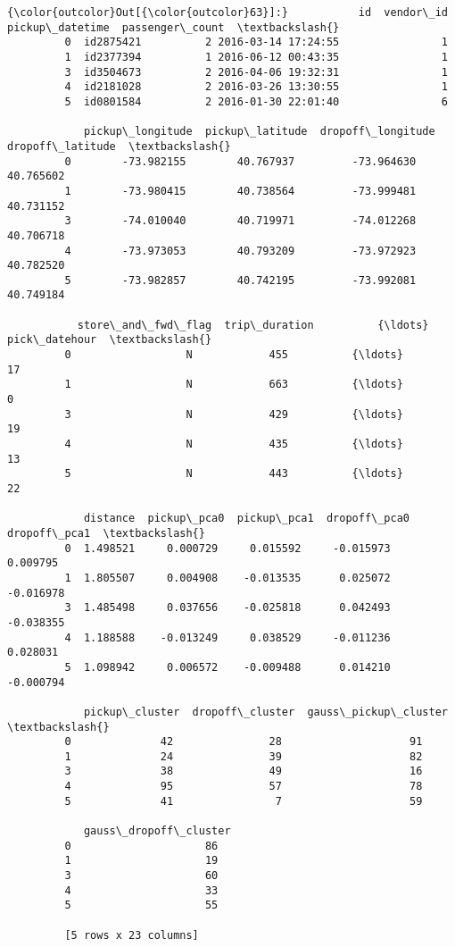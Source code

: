 \documentclass[11pt]{article}
\begin{document}
\begin{Verbatim}[commandchars=\\\{\}]
{\color{outcolor}Out[{\color{outcolor}63}]:}           id  vendor\_id     pickup\_datetime  passenger\_count  \textbackslash{}
         0  id2875421          2 2016-03-14 17:24:55                1   
         1  id2377394          1 2016-06-12 00:43:35                1   
         3  id3504673          2 2016-04-06 19:32:31                1   
         4  id2181028          2 2016-03-26 13:30:55                1   
         5  id0801584          2 2016-01-30 22:01:40                6   
         
            pickup\_longitude  pickup\_latitude  dropoff\_longitude  dropoff\_latitude  \textbackslash{}
         0        -73.982155        40.767937         -73.964630         40.765602   
         1        -73.980415        40.738564         -73.999481         40.731152   
         3        -74.010040        40.719971         -74.012268         40.706718   
         4        -73.973053        40.793209         -73.972923         40.782520   
         5        -73.982857        40.742195         -73.992081         40.749184   
         
           store\_and\_fwd\_flag  trip\_duration          {\ldots}            pick\_datehour  \textbackslash{}
         0                  N            455          {\ldots}                       17   
         1                  N            663          {\ldots}                        0   
         3                  N            429          {\ldots}                       19   
         4                  N            435          {\ldots}                       13   
         5                  N            443          {\ldots}                       22   
         
            distance  pickup\_pca0  pickup\_pca1  dropoff\_pca0  dropoff\_pca1  \textbackslash{}
         0  1.498521     0.000729     0.015592     -0.015973      0.009795   
         1  1.805507     0.004908    -0.013535      0.025072     -0.016978   
         3  1.485498     0.037656    -0.025818      0.042493     -0.038355   
         4  1.188588    -0.013249     0.038529     -0.011236      0.028031   
         5  1.098942     0.006572    -0.009488      0.014210     -0.000794   
         
            pickup\_cluster  dropoff\_cluster  gauss\_pickup\_cluster  \textbackslash{}
         0              42               28                    91   
         1              24               39                    82   
         3              38               49                    16   
         4              95               57                    78   
         5              41                7                    59   
         
            gauss\_dropoff\_cluster  
         0                     86  
         1                     19  
         3                     60  
         4                     33  
         5                     55  
         
         [5 rows x 23 columns]
\end{Verbatim}
            
\end{document}
